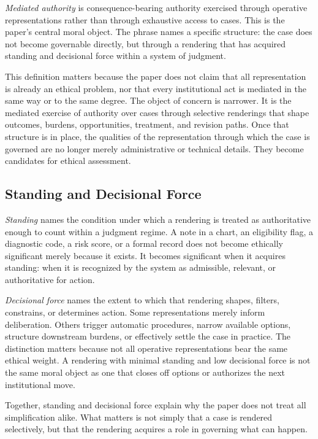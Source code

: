 \documentclass[11pt]{article}
\renewcommand{\emph}[1]{\textit{#1}}
\begin{document}
\emph{Mediated authority} is consequence-bearing authority exercised through operative representations rather than through exhaustive access to cases. This is the paper's central moral object. The phrase names a specific structure: the case does not become governable directly, but through a rendering that has acquired standing and decisional force within a system of judgment. \cite{Swanson2026MediatedJudgmentConstraint}

This definition matters because the paper does not claim that all representation is already an ethical problem, nor that every institutional act is mediated in the same way or to the same degree. The object of concern is narrower. It is the mediated exercise of authority over cases through selective renderings that shape outcomes, burdens, opportunities, treatment, and revision paths. Once that structure is in place, the qualities of the representation through which the case is governed are no longer merely administrative or technical details. They become candidates for ethical assessment.

\subsection{Standing and Decisional Force}

\emph{Standing} names the condition under which a rendering is treated as authoritative enough to count within a judgment regime. A note in a chart, an eligibility flag, a diagnostic code, a risk score, or a formal record does not become ethically significant merely because it exists. It becomes significant when it acquires standing: when it is recognized by the system as admissible, relevant, or authoritative for action. \cite{Swanson2026MediatedJudgmentConstraint}

\emph{Decisional force} names the extent to which that rendering shapes, filters, constrains, or determines action. Some representations merely inform deliberation. Others trigger automatic procedures, narrow available options, structure downstream burdens, or effectively settle the case in practice. The distinction matters because not all operative representations bear the same ethical weight. A rendering with minimal standing and low decisional force is not the same moral object as one that closes off options or authorizes the next institutional move.

Together, standing and decisional force explain why the paper does not treat all simplification alike. What matters is not simply that a case is rendered selectively, but that the rendering acquires a role in governing what can happen.
\end{document}
